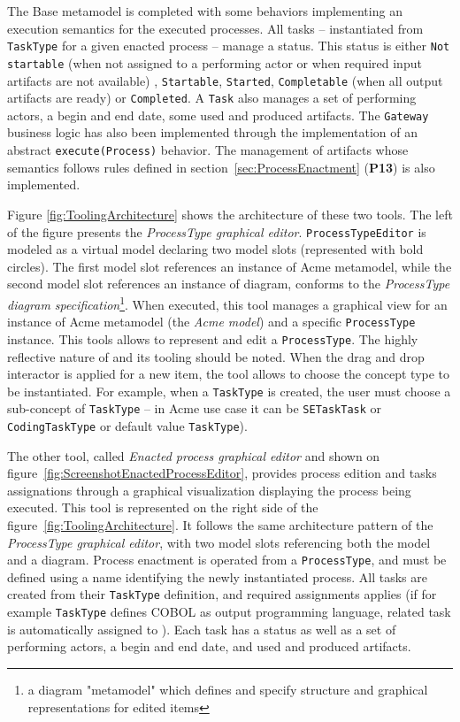 The Base metamodel is completed with some behaviors implementing an execution semantics for the executed processes. All tasks -- instantiated from \texttt{TaskType} for a given enacted process -- manage a status. This status is either \texttt{Not startable} (when not assigned to a performing actor or when required input artifacts are not available) , \texttt{Startable}, \texttt{Started}, \texttt{Completable} (when all output artifacts are ready) or \texttt{Completed}. A \texttt{Task} also manages a set of performing actors, a begin and end date, some used and produced artifacts. The \texttt{Gateway} business logic has also been implemented through the implementation of an abstract \texttt{execute(Process)} behavior. The management of artifacts whose semantics follows rules defined in section~\ref{sec:ProcessEnactment} (\textbf{P13}) is also implemented.

Figure \ref{fig:ToolingArchitecture} shows the architecture of these two tools.
 The left of the figure presents the \textit{ProcessType graphical editor}. \texttt{ProcessTypeEditor} is modeled as a virtual model declaring two model slots (represented with bold circles). The first model slot references an instance of Acme metamodel, while the second model slot references an instance of diagram, conforms to the \textit{ProcessType diagram specification}\footnote{a diagram "metamodel" which defines and specify structure and graphical representations for edited items}. When executed, this tool manages a graphical view for an instance of Acme metamodel (the \textit{Acme model}) and a specific \texttt{ProcessType} instance. This tools allows to represent and edit a \texttt{ProcessType}. The highly reflective nature of \FML and its tooling should be noted. When the drag and drop interactor is applied for a new item, the tool allows to choose the concept type to be instantiated. For example, when a \texttt{TaskType} is created, the user must choose a sub-concept of \texttt{TaskType} -- in Acme use case it can be \texttt{SETaskTask} or \texttt{CodingTaskType} or default value \texttt{TaskType}).

The other tool, called \textit{Enacted process graphical editor} and shown on figure~\ref{fig:ScreenshotEnactedProcessEditor}, provides process edition and tasks assignations through a graphical visualization displaying the process being executed. This tool is represented on the right side of the figure~\ref{fig:ToolingArchitecture}. It follows the same architecture pattern of the \textit{ProcessType graphical editor}, with two model slots referencing both the model and a diagram. Process enactment is operated from a \texttt{ProcessType}, and must be defined using a name identifying the newly instantiated process. All tasks are created from their \texttt{TaskType} definition, and required assignments applies (if for example  \texttt{TaskType} defines COBOL as output programming language, related task is automatically assigned to ). Each task has a status as well as a set of performing actors, a begin and end date, and used and produced artifacts.


